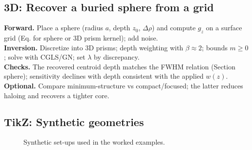 \documentclass[11pt,a4paper]{article}
\begin{document}
\subsection{3D: Recover a buried sphere from a grid}
\textbf{Forward.} Place a sphere (radius $a$, depth $z_0$, $\Delta\rho$) and compute $g_z$ on a surface grid (Eq. for sphere or 3D prism kernel); add noise.\\
\textbf{Inversion.} Discretize into 3D prisms; depth weighting with $\beta\approx2$; bounds $m\ge 0$; solve with CGLS/GN; set $\lambda$ by discrepancy.\\
\textbf{Checks.} The recovered centroid depth matches the FWHM relation (Section sphere); sensitivity declines with depth consistent with the applied $w(z)$.\\
\textbf{Optional.} Compare minimum-structure vs compact/focused; the latter reduces haloing and recovers a tighter core.

\subsection*{TikZ: Synthetic geometries}
\begin{figure}[h]
\centering
{}
\caption{Synthetic set-ups used in the worked examples.}
\end{figure}
\end{document}
